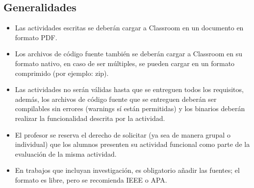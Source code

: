 \documentclass[10pt,letterpaper]{article}
\begin{document}
\subsection*{Generalidades}
\begin{itemize}
    \item Las actividades escritas se deberán cargar a Classroom en un documento en formato PDF.
    \item Los archivos de código fuente también se deberán cargar a Classroom en su formato nativo, en caso de ser múltiples, se pueden cargar en un formato comprimido (por ejemplo: zip).
    \item Las actividades no serán válidas hasta que se entreguen todos los requisitos, además, los archivos de código fuente que se entreguen deberán ser compilables sin errores (warnings sí están permitidas) y los binarios deberán realizar la funcionalidad descrita por la actividad. 
    \item El profesor se reserva el derecho de solicitar (ya sea de manera grupal o individual) que los alumnos presenten su actividad funcional como parte de la evaluación de la misma actividad.
    \item En trabajos que incluyan investigación, es obligatorio añadir las fuentes; el formato es libre, pero se recomienda IEEE o APA.
\end{itemize}
\end{document}
